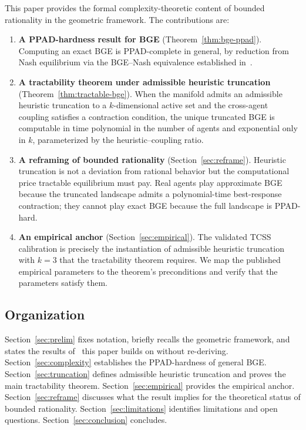 \documentclass[11pt]{article}
\theoremstyle{definition}
\theoremstyle{remark}
\begin{document}
This paper provides the formal complexity-theoretic content of bounded rationality in the geometric
framework. The contributions are:

\begin{enumerate}
\item \textbf{A PPAD-hardness result for BGE} (Theorem~\ref{thm:bge-ppad}). Computing an exact BGE is
\textsc{PPAD}-complete in general, by reduction from Nash equilibrium via the BGE--Nash equivalence
established in~\cite{bond2026geometric}.

\item \textbf{A tractability theorem under admissible heuristic truncation}
(Theorem~\ref{thm:tractable-bge}). When the manifold admits an admissible heuristic truncation to a
$k$-dimensional active set and the cross-agent coupling satisfies a contraction condition, the unique
truncated BGE is computable in time polynomial in the number of agents and exponential only in $k$,
parameterized by the heuristic--coupling ratio.

\item \textbf{A reframing of bounded rationality} (Section~\ref{sec:reframe}). Heuristic truncation
is not a deviation from rational behavior but the computational price tractable equilibrium must pay.
Real agents play approximate BGE because the truncated landscape admits a polynomial-time best-response
contraction; they cannot play exact BGE because the full landscape is \textsc{PPAD}-hard.

\item \textbf{An empirical anchor} (Section~\ref{sec:empirical}). The validated TCSS calibration is
precisely the instantiation of admissible heuristic truncation with $k=3$ that the tractability
theorem requires. We map the published empirical parameters to the theorem's preconditions and verify
that the parameters satisfy them.
\end{enumerate}

\subsection{Organization}

Section~\ref{sec:prelim} fixes notation, briefly recalls the geometric framework, and states the
results of~\cite{bond2026geometric,bond2026tcss} this paper builds on without re-deriving.
Section~\ref{sec:complexity} establishes the PPAD-hardness of general BGE. Section~\ref{sec:truncation}
defines admissible heuristic truncation and proves the main tractability theorem.
Section~\ref{sec:empirical} provides the empirical anchor. Section~\ref{sec:reframe} discusses what
the result implies for the theoretical status of bounded rationality. Section~\ref{sec:limitations}
identifies limitations and open questions. Section~\ref{sec:conclusion} concludes.
\end{document}
